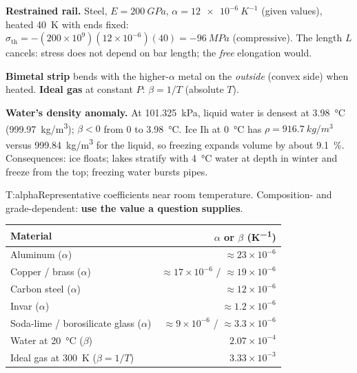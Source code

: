 \begin{multicols}{2}
\begin{demobox}\textbf{Restrained rail.} Steel, $E=\SI{200}{GPa}$, $\alpha=\SI{12e-6}{K^{-1}}$ (given values), heated \SI{40}{K} with ends fixed: $\sigma_{\text{th}}=-(200\times10^9)(12\times10^{-6})(40)=\SI{-96}{MPa}$ (compressive). The length $L$ cancels: stress does not depend on bar length; the \emph{free} elongation would.\end{demobox}

\textbf{Bimetal strip} bends with the higher-$\alpha$ metal on the \emph{outside} (convex side) when heated. \textbf{Ideal gas} at constant $P$: $\beta=1/T$ (absolute $T$).

\textbf{Water's density anomaly.} At \SI{101.325}{kPa}, liquid water is densest at \SI{3.98}{\celsius} (\SI{999.97}{kg/m^3}); $\beta<0$ from 0 to \SI{3.98}{\celsius}. Ice Ih at \SI{0}{\celsius} has $\rho=\SI{916.7}{kg/m^3}$ versus \SI{999.84}{kg/m^3} for the liquid, so freezing expands volume by about \SI{9.1}{\percent}. Consequences: ice floats; lakes stratify with \SI{4}{\celsius} water at depth in winter and freeze from the top; freezing water bursts pipes.

\begin{reftab}{T:alpha}{Representative coefficients near room temperature. Composition- and grade-dependent: \textbf{use the value a question supplies}.}
\small
\begin{tabularx}{\linewidth}{@{}Yr@{}}
\toprule
Material & $\alpha$ or $\beta$ (\si{K^{-1}})\\
\midrule
Aluminum ($\alpha$) & $\approx23\times10^{-6}$\\
Copper / brass ($\alpha$) & $\approx17\times10^{-6}$ / $\approx19\times10^{-6}$\\
Carbon steel ($\alpha$) & $\approx12\times10^{-6}$\\
Invar ($\alpha$) & $\approx1.2\times10^{-6}$\\
Soda-lime / borosilicate glass ($\alpha$) & $\approx9\times10^{-6}$ / $\approx3.3\times10^{-6}$\\
Water at \SI{20}{\celsius} ($\beta$) & $2.07\times10^{-4}$\\
Ideal gas at \SI{300}{K} ($\beta=1/T$) & $3.33\times10^{-3}$\\
\bottomrule
\end{tabularx}\end{reftab}
\end{multicols}
